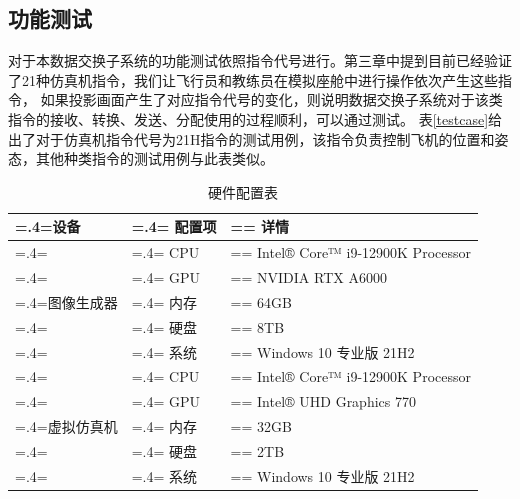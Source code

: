 \subsection{功能测试}
对于本数据交换子系统的功能测试依照指令代号进行。第三章中提到目前已经验证了21种仿真机指令，我们让飞行员和教练员在模拟座舱中进行操作依次产生这些指令，
如果投影画面产生了对应指令代号的变化，则说明数据交换子系统对于该类指令的接收、转换、发送、分配使用的过程顺利，可以通过测试。
表\ref{testcase}给出了对于仿真机指令代号为21H指令的测试用例，该指令负责控制飞机的位置和姿态，其他种类指令的测试用例与此表类似。
\clearpage
\begin{table}[h!]
    \begin{center}
        \caption{硬件配置表}
        \label{ffshard}
        \renewcommand\arraystretch{1.5}
        \begin{tabularx}{\textwidth}{ 
             >{\centering\arraybackslash\hsize=.4\hsize\linewidth=\hsize}X 
             >{\centering\arraybackslash\hsize=.4\hsize\linewidth=\hsize}X 
             >{\centering\arraybackslash\hsize=\hsize\linewidth=\hsize}X 
             }
             \hline
            \textbf{设备} & \textbf{配置项} & \textbf{详情}\\         
             \hline
             & CPU & Intel® Core™ i9-12900K Processor\\
           
             & GPU & NVIDIA RTX A6000\\
             
             图像生成器 & 内存 & 64GB\\
            
             & 硬盘 & 8TB\\
             
             & 系统 & Windows 10 专业版 21H2\\
             \hline
             & CPU & Intel® Core™ i9-12900K Processor\\
           
             & GPU & Intel® UHD Graphics 770\\
             
             虚拟仿真机 & 内存 & 32GB\\
            
             & 硬盘 & 2TB\\
             
             & 系统 & Windows 10 专业版 21H2\\
             \hline
             
            \end{tabularx}
    \end{center}
\end{table}
